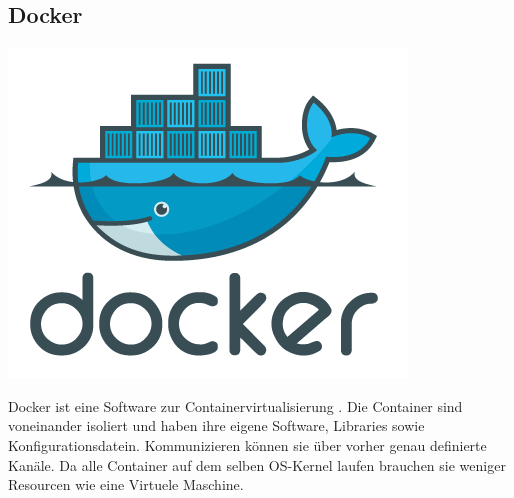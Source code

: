 \subsection{Docker}
\includegraphics[scale=0.05]{pics/dockerLogo.png}

Docker ist eine Software zur Containervirtualisierung . Die Container sind voneinander isoliert und haben ihre eigene Software, 
Libraries sowie Konfigurationsdatein. Kommunizieren können sie über vorher genau definierte Kanäle. Da alle Container 
auf dem selben OS-Kernel laufen brauchen sie weniger Resourcen wie eine Virtuele Maschine.